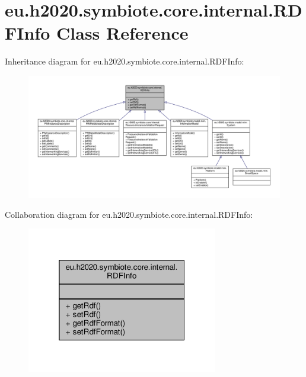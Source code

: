 \hypertarget{classeu_1_1h2020_1_1symbiote_1_1core_1_1internal_1_1RDFInfo}{}\section{eu.\+h2020.\+symbiote.\+core.\+internal.\+R\+D\+F\+Info Class Reference}
\label{classeu_1_1h2020_1_1symbiote_1_1core_1_1internal_1_1RDFInfo}


Inheritance diagram for eu.\+h2020.\+symbiote.\+core.\+internal.\+R\+D\+F\+Info\+:
\nopagebreak
\begin{figure}[H]
\begin{center}
\leavevmode
\includegraphics[width=350pt]{classeu_1_1h2020_1_1symbiote_1_1core_1_1internal_1_1RDFInfo__inherit__graph}
\end{center}
\end{figure}


Collaboration diagram for eu.\+h2020.\+symbiote.\+core.\+internal.\+R\+D\+F\+Info\+:
\nopagebreak
\begin{figure}[H]
\begin{center}
\leavevmode
\includegraphics[width=236pt]{classeu_1_1h2020_1_1symbiote_1_1core_1_1internal_1_1RDFInfo__coll__graph}
\end{center}
\end{figure}

